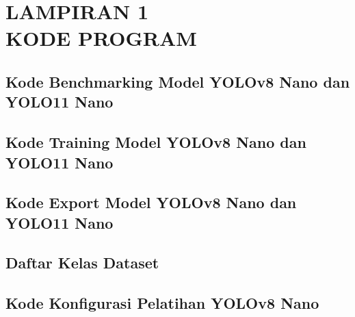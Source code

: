 
\appendix
\chapter*{LAMPIRAN 1 \\ KODE PROGRAM}
\addlampiran
{}

\section*{Kode Benchmarking Model YOLOv8 Nano dan YOLO11 Nano}


\section*{Kode Training Model YOLOv8 Nano dan YOLO11 Nano}


\section*{Kode Export Model YOLOv8 Nano dan YOLO11 Nano}


\section*{Daftar Kelas Dataset}


\section*{Kode Konfigurasi Pelatihan YOLOv8 Nano}
{\renewcommand{\YAMLkeystyle}{\color{black}\ttfamily\fontsize{10}{5.5}\selectfont}%
\renewcommand{\YAMLvaluestyle}{\color{codepurple}\ttfamily\fontsize{10}{5.5}\selectfont}%
\renewcommand{\YAMLcolonstyle}{\color{magenta}\mdseries}%
}


